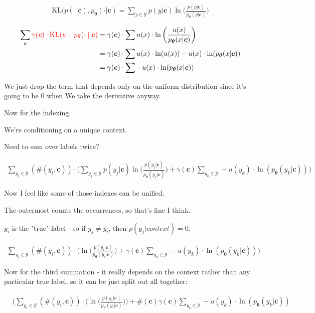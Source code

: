 \documentclass{article}
\newcommand{\KL}{\mathrm{KL}}
\newcommand{\uniform}{u}
\newcommand{\vtheta}{\boldsymbol{\theta}}
\newcommand{\model}{p_{\vtheta}}
\newcommand{\context}{\boldsymbol{c}}
\begin{document}
		\begin{align}
			\KL(p(\cdot|\context), \model(\cdot|\context) = \sum_{y\in\mathcal{Y}} p(y|\context)\ln\bigg(\frac{p(y|\context)}{\model(y|\context)} \bigg)
		\end{align}
		
		\begin{align}
			\sum_{\context} {\color{red}\gamma(\context) \cdot 						\KL(\uniform \mid\mid \model(\cdot \mid \context)} &= \gamma(\context)\cdot\sum u(x)\cdot \ln\bigg(\frac{u(x)}{\model(x|\context)}\bigg)\\
		&= \gamma(\context)\cdot\sum u(x)\cdot\ln(u(x)) - u(x)\cdot\ln(\model(x|\context))\\
		&= \gamma(\context)\cdot\sum - u(x)\cdot\ln(\model(x|\context))
		\end{align}
		
		We just drop the term that depends only on the uniform distribution since it's going to be 0 when We take the derivative anyway.
		
		Now for the indexing. 
		
		We're conditioning on a unique context.
		
		Need to sum over labels twice?
		
		\begin{align}
			\sum_{y_i\in\mathcal{Y}} (\#(y_i, \context))\cdot \bigg( \sum_{y_j\in\mathcal{Y}} p(y_j|\context)\ln\bigg(\frac{p(y_j|\context)}{\model(y_j|\context)} \bigg) + \gamma(\context)\sum_{y_k\in\mathcal{Y}} - u(y_k)\cdot\ln(\model(y_k|\context)) \bigg)
		\end{align}	
		
		Now I feel like some of those indexes can be unified.
		
		The outermost counts the occurrences, so that's fine I think.
		
		$y_i$ is the "true" label - so if $y_j\neq y_i$, then $p(y_j|context) = 0$. 
		
		\begin{align}
			\sum_{y_i\in\mathcal{Y}} (\#(y_i, \context))\cdot \bigg(  \ln\bigg(\frac{p(y_i|\context)}{\model(y_i|\context)} \bigg) + \gamma(\context)\sum_{y_k\in\mathcal{Y}} - u(y_k)\cdot\ln(\model(y_k|\context)) \bigg)
		\end{align}		
			
		Now for the third summation - it really depends on the context rather than any particular true label, so it can be just split out all together:
		
		\begin{align}
			&\bigg(\sum_{y_i\in\mathcal{Y}} (\#(y_i, \context))\cdot \bigg( \ln\bigg(\frac{p(y_i|\context)}{\model(y_i|\context)} \bigg)\bigg) + \#(\context)\gamma(\context)\sum_{y_k\in\mathcal{Y}} - u(y_k)\cdot\ln(\model(y_k|\context)) 
		\end{align}	
		
\end{document}
